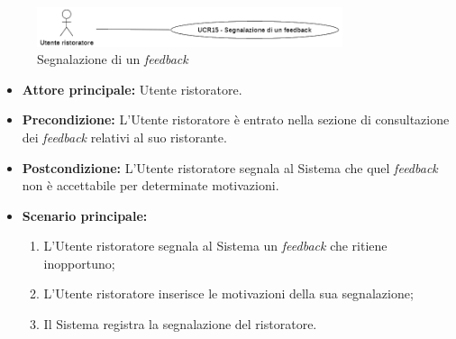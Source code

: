 \label{usecase:Segnalazione di un feedback}

\begin{figure}[h]
	\centering
	\includegraphics[width=0.8\textwidth]{./uml/UCR15.png} 
	\caption{Segnalazione di un \textit{feedback}}
	\label{fig:UCR15}
  \end{figure}

\begin{itemize}
	\item \textbf{Attore principale:} Utente ristoratore.

	\item \textbf{Precondizione:} L'Utente ristoratore è entrato nella sezione di consultazione dei \textit{feedback} relativi al suo ristorante.

	\item \textbf{Postcondizione:} L'Utente ristoratore segnala al Sistema che quel \textit{feedback} non è accettabile per determinate motivazioni.


	\item \textbf{Scenario principale:}
	      \begin{enumerate}
		      \item L'Utente ristoratore segnala al Sistema un \textit{feedback} che ritiene inopportuno;
		      \item L'Utente ristoratore inserisce le motivazioni della sua segnalazione;
		      \item Il Sistema registra la segnalazione del ristoratore.

	      \end{enumerate}
\end{itemize}
